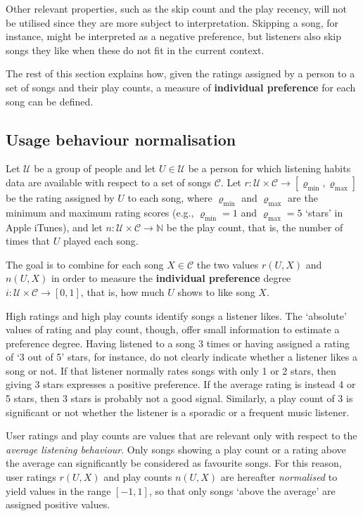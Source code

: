 Other relevant properties, such as the skip count and the play recency, will not be utilised since they are more subject to interpretation. %
Skipping a song, for instance, might be interpreted as a negative preference, but listeners also skip songs they like when these do not fit in the current context. 

The rest of this section explains how, given the ratings assigned by a person to a set of  songs and their play counts, a measure of \textbf{individual preference} for each song can be defined.

\subsection{Usage behaviour normalisation} %
\label{sub:usage_behaviour_normalisation}

Let $\mathcal{U}$ be a group of people and let $U \in \mathcal{U}$ be a person for which listening habits data are available with respect to a set of songs  $\mathcal{C}$.
Let $r: \mathcal{U} \times \mathcal{C} \to [\varrho_{\min}, \varrho_{\max}]$ be the rating assigned by $U$ to each song, where $\varrho_{\min}$ and $\varrho_{\max}$ are the minimum and maximum rating scores (e.g., $\varrho_{\min} = 1$ and $\varrho_{\max} = 5$ `stars' in Apple iTunes), and
let $n: \mathcal{U} \times \mathcal{C} \to \mathbb{N}$ be the play count, that is, the number of times that $U$ played each song.

The goal is to combine for each song $X \in \mathcal{C}$ the two values $r(U,X)$ and $n(U,X)$ in order to measure the \textbf{individual preference} degree $i: \mathcal{U} \times \mathcal{C} \to [0,1]$, that is, how much $U$ shows to like song $X$.

High ratings and high play counts identify songs a listener likes. 
The `absolute' values of rating and play count, though, offer small information to estimate a preference degree.
%
Having listened to a song 3 times or having assigned a rating of `3 out of 5' stars, for instance, do not clearly indicate whether a listener likes a song or not. If that listener normally rates songs with only 1 or 2 stars, then giving 3 stars expresses a positive preference. 
If the average rating is instead 4 or 5 stars, then 3 stars is probably not a good signal.
Similarly, a play count of 3 is significant or not whether the listener is a sporadic or a frequent music listener.

User ratings and play counts are values that are relevant only with respect to the \emph{average listening behaviour}.
Only songs showing a play count or a rating above the average can significantly be considered as favourite songs.
For this reason, user ratings $r(U,X)$ and play counts $n(U,X)$ are hereafter \emph{normalised} to yield values in the range $[-1,1]$, so that only songs `above the average' are assigned positive values.


